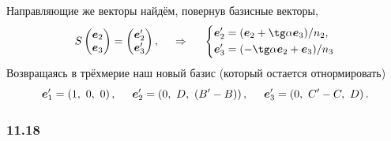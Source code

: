 Направляющие же векторы найдём, повернув базисные векторы, 
\begin{equation*}
    S \begin{pmatrix}
        \vc{e}_2 \\ \vc{e}_3
    \end{pmatrix} = 
    \begin{pmatrix}
        \vc{e}_2' \\ \vc{e}_3'
    \end{pmatrix},
    \hspace{0.5cm} \Rightarrow \hspace{0.5cm} 
    \left\{\begin{aligned}
        \vc{e}_2' &= (\vc{e}_2 + \tg \alpha \vc{e}_3) / n_2, \\
        \vc{e}_3' &= (-\tg \alpha \vc{e}_2 + \vc{e}_3) / n_3
    \end{aligned}\right.
\end{equation*}
Возвращаясь в трёхмерие наш новый базис (который остается отнормировать)
\begin{equation}
    \mbox{\boldmath $e$}_1' = \left(1,\ 0,\ 0\right), \hspace{0.5cm} 
    \mbox{\boldmath $e$}_2' = \left(0,\ D,\ (B'-B)\right), \hspace{0.5cm} 
    \mbox{\boldmath $e$}_3' = \left(0,\ C'-C,\ D\right).
\end{equation}


\subsubsection*{11.18}


